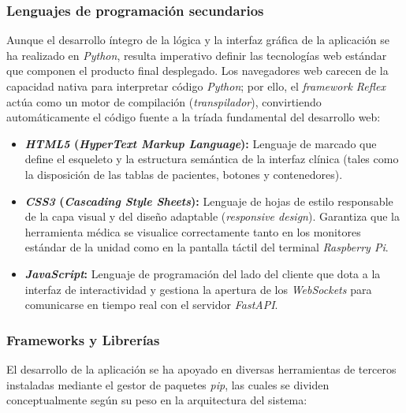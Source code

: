 \subsubsection{Lenguajes de programación secundarios}
Aunque el desarrollo íntegro de la lógica y la interfaz gráfica de la aplicación se ha realizado en \textit{Python}, resulta imperativo definir las tecnologías web estándar que componen el producto final desplegado. Los navegadores web carecen de la capacidad nativa para interpretar código \textit{Python}; por ello, el \textit{framework Reflex} actúa como un motor de compilación (\textit{transpilador}), convirtiendo automáticamente el código fuente a la tríada fundamental del desarrollo web:

\begin{itemize}
    \item \textbf{\textit{HTML5} (\textit{HyperText Markup Language}):} Lenguaje de marcado que define el esqueleto y la estructura semántica de la interfaz clínica (tales como la disposición de las tablas de pacientes, botones y contenedores). \cite{html}
    \item \textbf{\textit{CSS3} (\textit{Cascading Style Sheets}):} Lenguaje de hojas de estilo responsable de la capa visual y del diseño adaptable (\textit{responsive design}). Garantiza que la herramienta médica se visualice correctamente tanto en los monitores estándar de la unidad como en la pantalla táctil del terminal \textit{Raspberry Pi}. \cite{css}
    \item \textbf{\textit{JavaScript}:} Lenguaje de programación del lado del cliente que dota a la interfaz de interactividad y gestiona la apertura de los \textit{WebSockets} para comunicarse en tiempo real con el servidor \textit{FastAPI}. \cite{JavaScript}
\end{itemize}

\subsubsection{Frameworks y Librerías}
El desarrollo de la aplicación se ha apoyado en diversas herramientas de terceros instaladas mediante el gestor de paquetes \textit{pip}, las cuales se dividen conceptualmente según su peso en la arquitectura del sistema:

